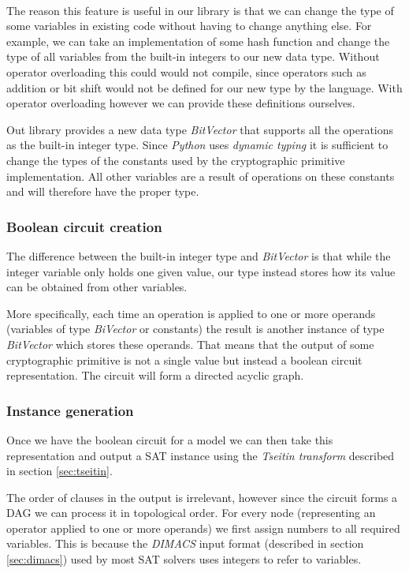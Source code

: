 ~\\

The reason this feature is useful in our library is that we can change the type of some variables in existing code without having to change anything else.
For example, we can take an implementation of some hash function and change the type of all variables from the built-in integers to our new data type.
Without operator overloading this could would not compile, since operators such as addition or bit shift would not be defined for our new type by the language.
With operator overloading however we can provide these definitions ourselves.

Out library provides a new data type \emph{BitVector} that supports all the operations as the built-in integer type.
Since \emph{Python} uses \emph{dynamic typing} it is sufficient to change the types of the constants used by the cryptographic primitive implementation.
All other variables are a result of operations on these constants and will therefore have the proper type.

\subsubsection{Boolean circuit creation}
The difference between the built-in integer type and \emph{BitVector} is that while the integer variable only holds one given value, our type instead stores how its value can be obtained from other variables.

More specifically, each time an operation is applied to one or more operands (variables of type \emph{BiVector} or constants) the result is another instance of type \emph{BitVector} which stores these operands.  That means that the output of some cryptographic primitive is not a single value but instead a boolean circuit representation. The circuit will form a directed acyclic graph.

\subsubsection{Instance generation}
Once we have the boolean circuit for a model we can then take this representation and output a SAT instance using the \emph{Tseitin transform} described in section \ref{sec:tseitin}.

The order of clauses in the output is irrelevant, however since the circuit forms a DAG we can process it in topological order.
For every node (representing an operator applied to one or more operands) we first assign numbers to all required variables.
This is because the \emph{DIMACS} input format (described in section \ref{sec:dimacs}) used by most SAT solvers uses integers to refer to variables.

